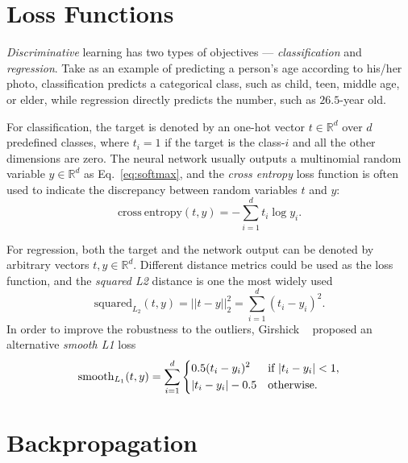 \section{Loss Functions} %
\label{sec:dl-loss}
\emph{Discriminative} learning has two types of objectives --- \emph{classification} and \emph{regression}. Take as an example of predicting a person's age according to his/her photo, classification predicts a categorical class, such as child, teen, middle age, or elder, while regression directly predicts the number, such as $26.5$-year old.

For classification, the target is denoted by an one-hot vector $t\in\mathbb{R}^d$ over $d$ predefined classes, where $t_i=1$ if the target is the class-$i$ and all the other dimensions are zero. The neural network usually outputs a multinomial random variable $y\in\mathbb{R}^d$ as Eq.~\eqref{eq:softmax}, and the \emph{cross entropy} loss function is often used to indicate the discrepancy between random variables $t$ and $y$:
\begin{equation}
  \mathrm{cross\ entropy}(t, y) = -\sum_{i=1}^d t_i \log y_i.
\end{equation}

For regression, both the target and the network output can be denoted by arbitrary vectors $t, y\in\mathbb{R}^d$. Different distance metrics could be used as the loss function, and the \emph{squared L2} distance is one the most widely used
\begin{equation}
  \mathrm{squared}_{L_2}(t, y) = ||t-y||_2^2 = \sum_{i=1}^d (t_i - y_i)^2.
\end{equation}
In order to improve the robustness to the outliers, Girshick \etal~\cite{girshick2015fast} proposed an alternative \emph{smooth L1} loss
\begin{equation}
  \mathrm{smooth}_{L_1}(t, y) = \sum_{i=1}^d \begin{dcases}
    0.5(t_i - y_i)^2 & \text{if }|t_i-y_i| < 1,\\
    |t_i-y_i| - 0.5  & \text{otherwise}.
  \end{dcases}
\end{equation}


\section{Backpropagation} %
\label{sec:dl-bp}

